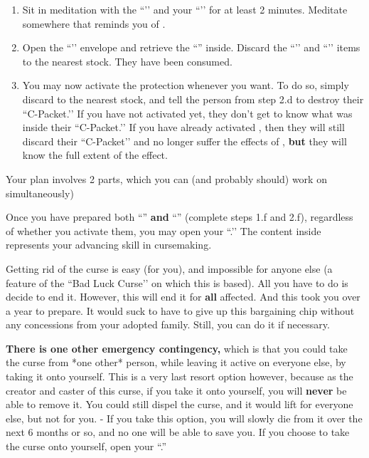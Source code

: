\documentclass[green]{GL2020}
\begin{document}
\begin{enumerate}
\begin{enumerate}
    \item Sit in meditation with the ``\iSlowActingPoisonCure{}’’ and your ``\iWIPProtection{}’’ for at least 2 minutes. Meditate somewhere that reminds you of \cFarmGod{}.
    \item Open the ``\iWIPProtection{}’’ envelope and retrieve the ``\iProtection{}'' inside. Discard the ``\iSlowActingPoisonCure{}’’ and ``\iWIPProtection{}’’ items to the nearest stock. They have been consumed.
    \item  You may now activate the protection whenever you want. To do so, simply discard \iProtection{} to the nearest stock, and tell the person from step 2.d to destroy their ``C-Packet.’’ If you have not activated \iWithering{} yet, they don’t get to know what was inside their ``C-Packet.’’ If you have already activated \iWithering{}, then they will still discard their ``C-Packet’’ and no longer suffer the effects of \iWithering{}, \textbf{but} they will know the full extent of the effect.
  \end{enumerate}
\end{enumerate}

Your plan involves 2 parts, which you can (and probably should) work on simultaneously)

Once you have prepared both ``\iWithering{}'' \textbf{and} ``\iProtection{}'' (complete steps 1.f and 2.f), regardless of whether you activate them, you may open your ``\mPacketThree{}.’’ The content inside represents your advancing skill in cursemaking.

Getting rid of the curse is easy (for you), and impossible for anyone else (a feature of the ``Bad Luck Curse’’ on which this is based). All you have to do is decide to end it. However, this will end it for \textbf{all} affected. And this took you over a year to prepare. It would suck to have to give up this bargaining chip without any concessions from your adopted family. Still, you can do it if necessary.

\textbf{There is one other emergency contingency,} which is that you could take the curse from *one other* person, while leaving it active on everyone else, by taking it onto yourself. This is a very last resort option however, because as the creator and caster of this curse, if you take it onto yourself, you will \textbf{never} be able to remove it. You could still dispel the curse, and it would lift for everyone else, but not for you. - If you take this option, you will slowly die from it over the next 6 months or so, and no one will be able to save you. If you choose to take the curse onto yourself, open your ``\mCPrimePacket{\MYname}.''
\end{document}
